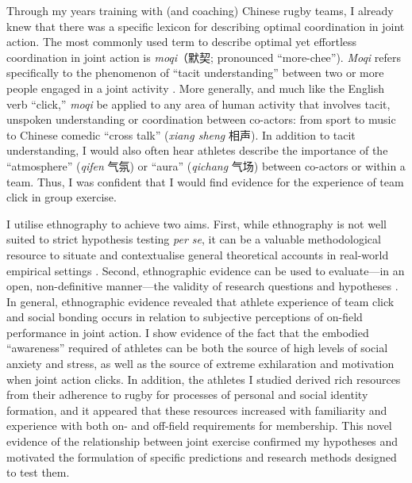 \begin{CJK}{UTF8}{gbsn}
Through my years training with (and coaching) Chinese rugby teams, I already knew that there was a specific lexicon for describing optimal coordination in joint action.  The most commonly used term to describe optimal yet effortless coordination in joint action is \textit{moqi}（默契; pronounced ``more-chee'').  \textit{Moqi} refers specifically to the phenomenon of ``tacit understanding'' between two or more people engaged in a joint activity \citep{Pleco2018}. More generally, and much like the English verb ``click,'' \textit{moqi} be applied to any area of human activity that involves tacit, unspoken understanding or coordination between co-actors: from sport to music to Chinese comedic ``cross talk'' (\textit{xiang sheng} 相声).  In addition to tacit understanding, I would also often hear athletes describe the importance of the ``atmosphere'' (\textit{qifen} 气氛) or ``aura'' (\textit{qichang} 气场) between co-actors or within a team.  Thus, I was confident that I would find evidence for the experience of team click in group exercise.


I utilise ethnography to achieve two aims.  First, while ethnography is not well suited to strict hypothesis testing \textit{per se}, it can be a valuable methodological resource to situate and contextualise general theoretical accounts in real-world empirical settings \citep{Whitehouse2012}.  Second, ethnographic evidence can be used to evaluate---in an open, non-definitive manner---the validity of research questions and hypotheses \citep{Fuentes2016}.  In general, ethnographic evidence revealed that athlete experience of team click and social bonding occurs in relation to subjective perceptions of on-field performance in joint action.  I show evidence of the fact that the embodied ``awareness'' required of athletes can be both the source of high levels of social anxiety and stress, as well as the source of extreme exhilaration and motivation when joint action clicks.  In addition, the athletes I studied derived rich resources from their adherence to rugby for processes of personal and social identity formation, and it appeared that these resources increased with familiarity and experience with both on- and off-field requirements for membership.  This novel evidence of the relationship between joint exercise confirmed my hypotheses and motivated the formulation of specific predictions and research methods designed to test them.


\end{CJK}

